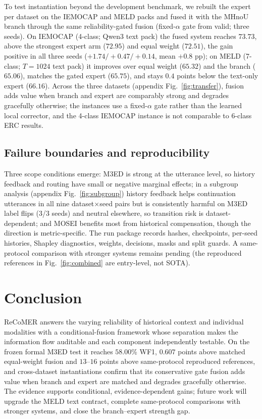 \documentclass[10pt,twocolumn,letterpaper]{article}
\begin{document}
To test instantiation beyond the development benchmark, we rebuilt the expert per dataset on the IEMOCAP and MELD packs and fused it with the MHnoU branch through the same reliability-gated fusion (fixed-$\alpha$ gate from valid; three seeds).
On IEMOCAP (4-class; Qwen3 text pack) the fused system reaches $73.73$, above the strongest expert arm ($72.95$) and equal weight ($72.51$), the gain positive in all three seeds ($+1.74/+0.47/+0.14$, mean $+0.8$ pp);
on MELD (7-class; $T{=}1024$ text pack) it improves over equal weight ($65.32$) and the branch ($65.06$), matches the gated expert ($65.75$), and stays $0.4$ points below the text-only expert ($66.16$).
Across the three datasets (appendix Fig.~\ref{fig:transfer}), fusion adds value when branch and expert are comparably strong and degrades gracefully otherwise; the instances use a fixed-$\alpha$ gate rather than the learned local corrector, and the 4-class IEMOCAP instance is not comparable to 6-class ERC results.

\subsection{Failure boundaries and reproducibility}
\label{sec:limits}


Three scope conditions emerge: M3ED is strong at the utterance level, so history feedback and routing have small or negative marginal effects; in a subgroup analysis (appendix Fig.~\ref{fig:subgroup}) history feedback helps continuation utterances in all nine dataset$\times$seed pairs but is consistently harmful on M3ED label flips (3/3 seeds) and neutral elsewhere, so transition risk is dataset-dependent; and MOSEI benefits most from historical compensation, though the direction is metric-specific.
The run package records hashes, checkpoints, per-seed histories, Shapley diagnostics, weights, decisions, masks and split guards.
A same-protocol comparison with stronger systems remains pending (the reproduced references in Fig.~\ref{fig:combined} are entry-level, not SOTA).



\section{Conclusion}
\label{sec:conclusion}

ReCoMER answers the varying reliability of historical context and individual modalities with a conditional-fusion framework whose separation makes the information flow auditable and each component independently testable.
On the frozen formal M3ED test it reaches $58.00$\% WF1, $0.607$ points above matched equal-weight fusion and $13$--$16$ points above same-protocol reproduced references, and cross-dataset instantiations confirm that its conservative gate fusion adds value when branch and expert are matched and degrades gracefully otherwise.
The evidence supports conditional, evidence-dependent gains; future work will upgrade the MELD text contract, complete same-protocol comparisons with stronger systems, and close the branch--expert strength gap.
\end{document}
